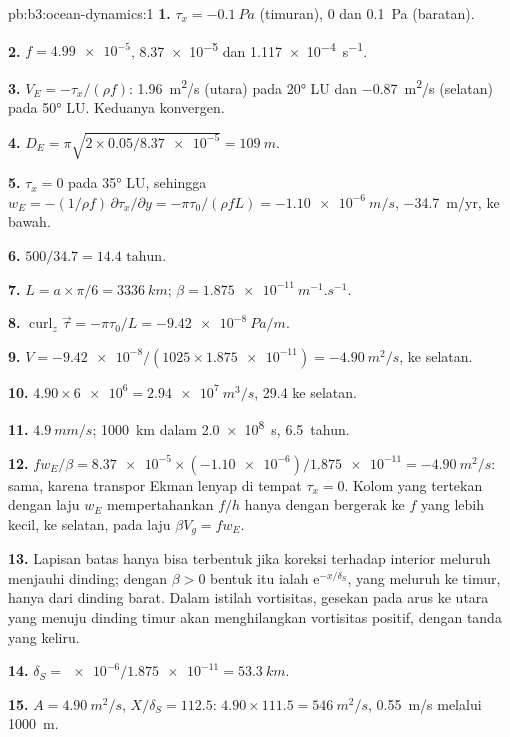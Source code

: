\begin{solution}{pb:b3:ocean-dynamics:1}
\textbf{1.} $\tau_x = \qty{-0.1}{Pa}$ (timuran), 0 dan \qty{+0.1}{Pa}
(baratan).

\textbf{2.} $f = \num{4.99e-5}$, \num{8.37e-5} dan
\qty{1.117e-4}{s^{-1}}.

\textbf{3.} $V_E = -\tau_x/(\rho f)$: \qty{+1.96}{m^2/s} (utara) pada
\ang{20} LU dan \qty{-0.87}{m^2/s} (selatan) pada \ang{50} LU. Keduanya konvergen.

\textbf{4.} $D_E = \pi\sqrt{2\times0.05/\num{8.37e-5}} = \qty{109}{m}$.

\textbf{5.} $\tau_x = 0$ pada \ang{35} LU, sehingga $w_E = -(1/\rho f)\,
\partial\tau_x/\partial y = -\pi\tau_0/(\rho fL) = \qty{-1.10e-6}{m/s}$,
\qty{-34.7}{m/yr}, ke bawah.

\textbf{6.} $500/34.7 = \num{14.4}\text{ tahun}$.

\textbf{7.} $L = a\times\pi/6 = \qty{3336}{km}$; $\beta =
\qty{1.875e-11}{m^{-1}.s^{-1}}$.

\textbf{8.} $\operatorname{curl}_z\vec\tau = -\pi\tau_0/L =
\qty{-9.42e-8}{Pa/m}$.

\textbf{9.} $V = \num{-9.42e-8}/(1025\times\num{1.875e-11}) =
\qty{-4.90}{m^2/s}$, ke selatan.

\textbf{10.} $4.90\times\num{6e6} = \qty{2.94e7}{m^3/s}$,
\qty{29.4}{\sverdrup} ke selatan.

\textbf{11.} $\qty{4.9}{mm/s}$; \qty{1000}{km} dalam \qty{2.0e8}{s},
\num{6.5}~tahun.

\textbf{12.} $fw_E/\beta = \num{8.37e-5}\times(\num{-1.10e-6})/
\num{1.875e-11} = \qty{-4.90}{m^2/s}$: sama, karena transpor Ekman
lenyap di tempat $\tau_x = 0$. Kolom yang tertekan dengan laju $w_E$
mempertahankan  $f/h$ hanya dengan bergerak ke $f$ yang lebih kecil, ke selatan,
pada laju $\beta V_g = fw_E$.

\textbf{13.} Lapisan batas hanya bisa terbentuk jika koreksi terhadap interior meluruh menjauhi dinding;
dengan $\beta > 0$ bentuk itu ialah
$\mathrm e^{-x/\delta_S}$, yang meluruh ke timur, hanya dari dinding barat.
Dalam istilah vortisitas, gesekan pada arus ke utara yang menuju dinding timur
akan menghilangkan vortisitas positif, dengan tanda yang keliru.

\textbf{14.} $\delta_S = \num{e-6}/\num{1.875e-11} = \qty{53.3}{km}$.

\textbf{15.} $A = \qty{4.90}{m^2/s}$, $X/\delta_S = 112.5$:
$4.90\times111.5 = \qty{546}{m^2/s}$, \qty{0.55}{m/s} melalui
\qty{1000}{m}.


\end{solution}
